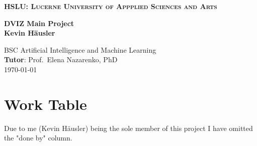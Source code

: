 \documentclass[11pt,a4paper]{article}
\newcommand{\school}{HSLU: Lucerne University of Appplied Sciences and Arts}
\newcommand{\degree}{BSC Artificial Intelligence and Machine Learning}
\newcommand{\projtitle}{DVIZ Main Project}
\newcommand{\projauthor}{Kevin Häusler}
\newcommand{\tutor}{Prof.\ Elena Nazarenko, PhD}
\begin{document}
\setcounter{page}{1}


\begin{titlepage}
\center

\vspace{-15mm}
{\large \textbf{\textsc{\school}}}\\

\vfill

{\Large \textbf{\projtitle}}\\[8mm]

{\Large \textbf{\projauthor}}\\

\vfill


\vfill

{\large \degree}\\[8mm]
{\large \textbf{Tutor}: \tutor}\\[8mm]

\today

\end{titlepage}


\renewcommand{\contentsname}{Table of Contents}

\tableofcontents
\newpage

\section{Work Table}

Due to me (Kevin Häusler) being the sole member of this project I have omitted the "done by" column.
\end{document}

